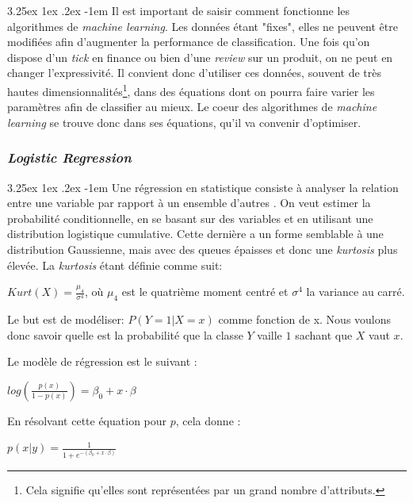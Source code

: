 \documentclass[a4paper, 11pt]{article}
\makeatletter
\renewcommand\paragraph{\@startsection{paragraph}{5}{\z@}%
  {3.25ex \@plus1ex \@minus.2ex}%
  {-1em}%
  {\normalfont\normalsize\bfseries}}
\makeatother
\begin{document}
\paragraph{}
Il est important de saisir comment fonctionne les algorithmes de \textit{machine learning}. Les données étant "fixes", elles ne peuvent être modifiées afin d'augmenter la performance de classification. Une fois qu'on dispose d'un \textit{tick} en finance ou bien d'une \textit{review}  sur un produit, on ne peut en changer l'expressivité. Il convient donc d'utiliser ces données, souvent de très hautes dimensionnalités\footnote{Cela signifie qu'elles sont représentées par un grand nombre d'attributs.}, dans des équations dont on pourra faire varier les paramètres afin de classifier au mieux. Le coeur des algorithmes de \textit{machine learning} se trouve donc dans ses équations, qu'il va convenir d'optimiser.

\subsubsection{\textit{Logistic Regression}} \label{section régression logistique}
\paragraph{}
Une régression en statistique consiste à analyser la relation entre une variable par rapport à un ensemble d'autres \cite{wikipedia_regression}. On veut estimer la probabilité conditionnelle, en se basant sur des variables et en utilisant une distribution logistique cumulative. Cette dernière a un forme semblable à une distribution Gaussienne, mais avec des queues épaisses et donc une \textit{kurtosis} plus élevée. La \textit{kurtosis} étant définie comme suit:
\begin{center}
$Kurt(X) = \frac{\mu_4}{\sigma^4}$, où $\mu_4$ est le quatrième moment centré et $\sigma^4$ la variance au carré. 
\end{center}
Le but est de modéliser: $P(Y=1 | X=x)$ comme fonction de x. Nous voulons donc savoir quelle est la probabilité que la classe $Y$ vaille $1$ sachant que $X$ vaut $x$.

Le modèle de régression est le suivant \cite{machine_learning_automated_trading}:
\begin{center}
$log(\frac{p(x)}{1 - p(x)}) = \beta_0 + x \cdot \beta$
\end{center}

En résolvant cette équation pour $p$, cela donne \cite{machine_learning_automated_trading}:
\begin{center}
$p(x|y) = \frac{1}{1 + e^{-(\beta_0 + x \cdot \beta)}}$
\end{center}
\end{document}
